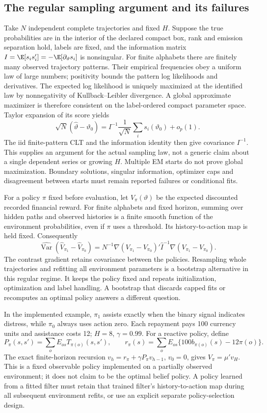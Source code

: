 \subsection{The regular sampling argument and its failures}
Take $N$ independent complete trajectories and fixed $H$. Suppose the true
probabilities are in the interior of the declared compact box, rank and
emission separation hold, labels are fixed, and the information matrix
$I=\E[s_i s_i']=-\E[\partial_\vartheta s_i]$ is nonsingular.
For finite alphabets there are finitely many observed trajectory patterns.
Their empirical frequencies obey a uniform law of large numbers; positivity
bounds the pattern log likelihoods and derivatives. The expected log
likelihood is uniquely maximized at the identified law by nonnegativity
of Kullback--Leibler divergence. A global approximate maximizer is
therefore consistent on the label-ordered compact parameter space.
Taylor expansion of its score yields
\begin{equation}
 \sqrt N(\widehat\vartheta-\vartheta_0)
 =I^{-1}\frac1{\sqrt N}\sum_i s_i(\vartheta_0)+o_p(1).
 \label{s4:latent-mle-clt}
\end{equation}
The iid finite-pattern CLT and the information identity then give
covariance $I^{-1}$. This supplies an argument for the actual sampling
law, not a generic claim about a single dependent series or growing $H$.
Multiple EM starts do not prove global maximization. Boundary solutions,
singular information, optimizer caps and disagreement between starts must
remain reported failures or conditional fits.

For a policy $\pi$ fixed before evaluation, let $V_\pi(\vartheta)$ be
the expected discounted recorded financial reward. For finite alphabets
and fixed horizon, summing over hidden paths and observed histories is a
finite smooth function of the environment probabilities, even if $\pi$
uses a threshold. Its history-to-action map is held fixed. Consequently
\[
 \widehat{\operatorname{Var}}(\widehat V_{\pi_1}-\widehat V_{\pi_0})
 =N^{-1}\nabla(V_{\pi_1}-V_{\pi_0})'
       \widehat I^{-1}\nabla(V_{\pi_1}-V_{\pi_0}).
\]
The contrast gradient retains covariance between the policies. Resampling
whole trajectories and refitting all environment parameters is a bootstrap
alternative in this regular regime. It keeps the policy fixed and repeats
initialization, optimization and label handling. A bootstrap that discards
capped fits or recomputes an optimal policy answers a different question.

In the implemented example, $\pi_1$ assists exactly when the binary signal
indicates distress, while $\pi_0$ always uses action zero. Each repayment
pays 100 currency units and assistance costs 12; $H=8$, $\gamma=0.99$.
For a reactive policy, define
\[
 P_\pi(s,s')=\sum_o E_{os}T_{\pi(o)}(s,s'),\qquad
 r_\pi(s)=\sum_o E_{os}\{100b_{\pi(o)}(s)-12\pi(o)\}.
\]
The exact finite-horizon recursion $v_h=r_\pi+\gamma P_\pi v_{h-1}$,
$v_0=0$, gives $V_\pi=\mu'v_H$. This is a fixed observable policy
implemented on a partially observed environment; it does not claim to
be the optimal belief policy. A policy learned from a fitted filter must
retain that trained filter's history-to-action map during all subsequent
environment refits, or use an explicit separate policy-selection design.

